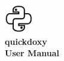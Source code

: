 \clearpage
\begin{titlepage}

\begin{center}
\includegraphics[height=1.25cm]{../includes/icon_main.png}\\
\vspace*{6cm}%
\textbf{\Huge quickdoxy}\\
\vspace*{0.25cm}%
\textbf{\huge User Manual}\\
\vspace*{8.5cm}%
\end{center}

\begin{flushright}
	\mbox{\scriptsize
	
	}
\end{flushright}
\end{titlepage}